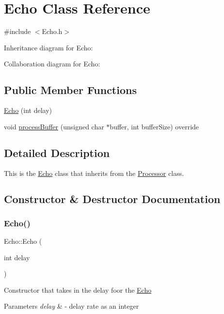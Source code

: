\hypertarget{classEcho}{}\section{Echo Class Reference}
\label{classEcho}


{\ttfamily \#include $<$Echo.\+h$>$}



Inheritance diagram for Echo\+:


Collaboration diagram for Echo\+:
\subsection*{Public Member Functions}
\begin{DoxyCompactItemize}
\item 
\hyperlink{classEcho_a9531515ffab8be1e38cbdc0e0e9338a6}{Echo} (int delay)
\item 
void \hyperlink{classEcho_ae915d9d4065a34411d18791a5ae9006b}{process\+Buffer} (unsigned char $\ast$buffer, int buffer\+Size) override
\end{DoxyCompactItemize}


\subsection{Detailed Description}
This is the \hyperlink{classEcho}{Echo} class that inherits from the \hyperlink{classProcessor}{Processor} class. 

\subsection{Constructor \& Destructor Documentation}
\mbox{\label{classEcho_a9531515ffab8be1e38cbdc0e0e9338a6}} 
\subsubsection{\texorpdfstring{Echo()}{Echo()}}
{\footnotesize\ttfamily Echo\+::\+Echo (\begin{DoxyParamCaption}\item[{int}]{delay }\end{DoxyParamCaption})\hspace{0.3cm}{\ttfamily [explicit]}}

Constructor that takes in the delay foor the \hyperlink{classEcho}{Echo} 
\begin{DoxyParams}{Parameters}
{\em delay} & -\/ delay rate as an integer \\
\hline
\end{DoxyParams}


